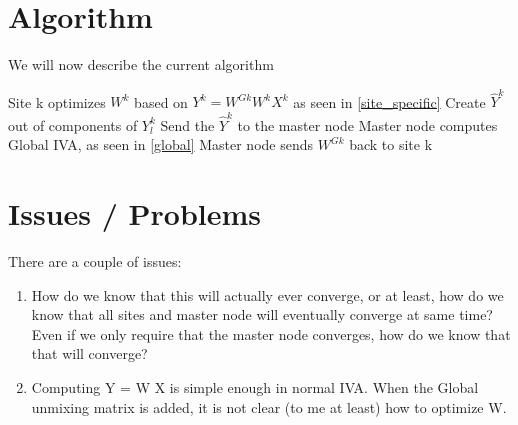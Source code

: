\documentclass{amsproc}
\begin{document}
\pagebreak

\section{Algorithm} We will now describe the current algorithm


\begin{algorithmic}
        \State Site k optimizes $W^k$ based on $Y^k = W^{Gk} W^k X^k$ as seen in \ref{site_specific}
        \State Create $\hat{Y}^k$ out of components of $Y^k_l$
        \State Send the $\hat{Y}^k$ to the master node
    \EndFor
    \State Master node computes Global IVA, as seen in \ref{global}
    \State Master node sends $W^{Gk}$ back to site k
\EndWhile
\end{algorithmic}


\section{Issues / Problems}




There are a couple of issues: 

\begin{enumerate}
    \item How do we know that this will actually ever converge, or at least, how do we know that all sites and master node will eventually converge at same time? Even if we only require that the master node converges, how do we know that that will converge?

    \item Computing Y = W X is simple enough in normal IVA. When the Global unmixing matrix is added, it is not clear (to me at least) how to optimize W.

\end{enumerate}
\end{document}
